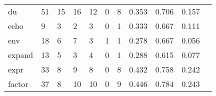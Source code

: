 \begin{longtable}{lp{1.2cm}p{1.2cm}p{1.2cm}p{1.2cm}p{1.2cm}p{1.2cm}p{1.2cm}p{1.2cm}p{1.2cm}p{1.2cm}}
du        &                                    51 &                                                 15 &                                                 16 &                                                 12 &                                                  0 &                                                  8 &                                              0.353 &                                              0.706 &                                              0.157 \\
echo      &                                     9 &                                                  3 &                                                  2 &                                                  3 &                                                  0 &                                                  1 &                                              0.333 &                                              0.667 &                                              0.111 \\
env       &                                    18 &                                                  6 &                                                  7 &                                                  3 &                                                  1 &                                                  1 &                                              0.278 &                                              0.667 &                                              0.056 \\
expand    &                                    13 &                                                  5 &                                                  3 &                                                  4 &                                                  0 &                                                  1 &                                              0.288 &                                              0.615 &                                              0.077 \\
expr      &                                    33 &                                                  8 &                                                  9 &                                                  8 &                                                  0 &                                                  8 &                                              0.432 &                                              0.758 &                                              0.242 \\
factor    &                                    37 &                                                  8 &                                                 10 &                                                 10 &                                                  0 &                                                  9 &                                              0.446 &                                              0.784 &                                              0.243 \\

\end{longtable}
